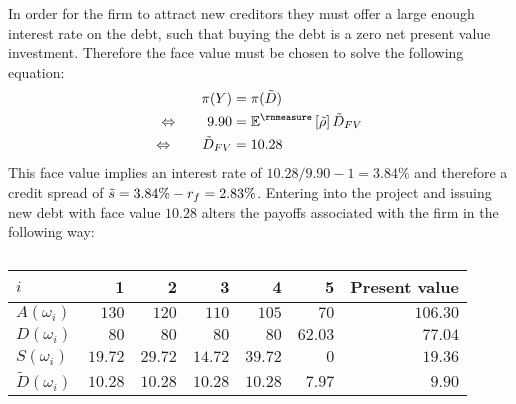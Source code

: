 \documentclass[main.tex]{subfiles}
\begin{document}
        In order for the firm to attract new creditors they must offer a large enough interest rate on the debt, 
        such that buying the debt is a zero net present value investment.
        Therefore the face value must be chosen to solve the following equation:
            \begin{align}
                \pi(Y) &= \pi(\tilde{D}) \\
                \Leftrightarrow  \qquad
                9.90 &= \mathbb{E}^{\rnmeasure}\left[\tilde{\rho}\right] \tilde{D}_{FV} \\
                \Leftrightarrow  \qquad
                \tilde{D}_{FV} &= 10.28
            \end{align}
        This face value implies an interest rate of $10.28 / 9.90 - 1 = 3.84\%$
        and therefore a credit spread of $\tilde{s} = 3.84\% - r_{f} = 2.83\%$.
        Entering into the project and issuing new debt with face value $10.28$ 
        alters the payoffs associated with the firm in the following way:
        \begin{table}[H]
            \centering
            \begin{tabular}{l|rrrrr||r}
                $i$ & 1 & 2 & 3 & 4 & 5 & Present value \\
                \hline
                $A(\omega_{i})$ & $130$ & $120$ & $110$ & $105$ & $70$ & $106.30$ \\
                $D(\omega_{i})$ & $80$ & $80$ & $80$ & $80$ & $62.03$ & $77.04$ \\
                $S(\omega_{i})$ & $19.72$ & $29.72$ & $14.72$ & $39.72$ & $0$ & $19.36$ \\
                $\tilde{D}(\omega_{i})$ & $10.28$ & $10.28$ & $10.28$ & $10.28$ & $7.97$ & $9.90$ \\
            \end{tabular}
            \caption{}
        \end{table}
\end{document}
